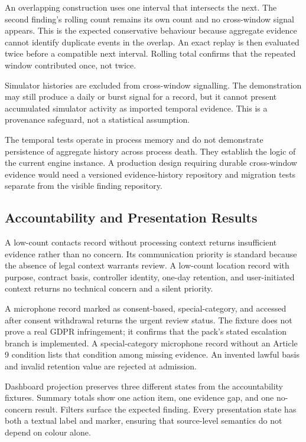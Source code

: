 An overlapping construction uses one interval that intersects the next. The second finding's rolling count remains its own count and no cross-window signal appears. This is the expected conservative behaviour because aggregate evidence cannot identify duplicate events in the overlap. An exact replay is then evaluated twice before a compatible next interval. Rolling total confirms that the repeated window contributed once, not twice.

Simulator histories are excluded from cross-window signalling. The demonstration may still produce a daily or burst signal for a record, but it cannot present accumulated simulator activity as imported temporal evidence. This is a provenance safeguard, not a statistical assumption.

The temporal tests operate in process memory and do not demonstrate persistence of aggregate history across process death. They establish the logic of the current engine instance. A production design requiring durable cross-window evidence would need a versioned evidence-history repository and migration tests separate from the visible finding repository.

\subsection{Accountability and Presentation Results}

A low-count contacts record without processing context returns insufficient evidence rather than no concern. Its communication priority is standard because the absence of legal context warrants review. A low-count location record with purpose, contract basis, controller identity, one-day retention, and user-initiated context returns no technical concern and a silent priority.

A microphone record marked as consent-based, special-category, and accessed after consent withdrawal returns the urgent review status. The fixture does not prove a real GDPR infringement; it confirms that the pack's stated escalation branch is implemented. A special-category microphone record without an Article 9 condition lists that condition among missing evidence. An invented lawful basis and invalid retention value are rejected at admission.

Dashboard projection preserves three different states from the accountability fixtures. Summary totals show one action item, one evidence gap, and one no-concern result. Filters surface the expected finding. Every presentation state has both a textual label and marker, ensuring that source-level semantics do not depend on colour alone.

